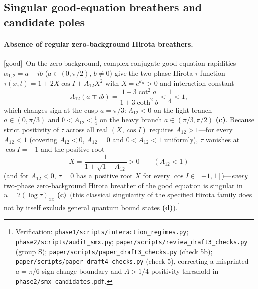 \documentclass[11pt,a4paper]{article}
\newcommand{\lab}[1]{{\normalfont\sffamily\footnotesize\bfseries(#1)}}
\newcommand{\Lc}{\lab{c}}
\newcommand{\Ld}{\lab{d}}
\newcommand{\eqtag}[2]{{\normalfont\sffamily\footnotesize\textcolor{#1}{[#2]}}}
\newcommand{\Good}{\eqtag{teal!70!black}{good}}
\newcommand{\scr}[1]{\nolinkurl{#1}}
\newcommand{\chk}[1]{\footnote{\raggedright Verification: #1.}}
\theoremstyle{remark}
\begin{document}
\subsection{Singular good-equation breathers and candidate poles}\label{sec:goodbreathers}

\paragraph{Absence of regular zero-background Hirota breathers.} \Good\ On the zero background, complex-conjugate good-equation rapidities $\alpha_{1,2}=a\mp ib$ ($a\in(0,\pi/2)$, $b\neq0$) give the two-phase Hirota $\tau$-function $\tau(x,t)=1+2X\cos I+A_{12}X^2$ with $X=e^{\theta_R}>0$ and interaction constant
\begin{equation}\label{eq:Agoodbr}
A_{12}(a\mp ib)=\frac{1-3\cot^2a}{1+3\coth^2b}<\frac14<1,
\end{equation}
which changes sign at the cusp $a=\pi/3$: $A_{12}<0$ on the light branch $a\in(0,\pi/3)$ and $0<A_{12}<\tfrac14$ on the heavy branch $a\in(\pi/3,\pi/2)$ \Lc. Because strict positivity of $\tau$ across all real $(X,\cos I)$ requires $A_{12}>1$---for every $A_{12}<1$ (covering $A_{12}<0$, $A_{12}=0$ and $0<A_{12}<1$ uniformly), $\tau$ vanishes at $\cos I=-1$ and the positive root
\[
X=\frac1{1+\sqrt{1-A_{12}}}>0\qquad(A_{12}<1)
\]
(and for $A_{12}<0$, $\tau=0$ has a positive root $X$ for every $\cos I\in[-1,1]$)---\emph{every} two-phase zero-background Hirota breather of the good equation is singular in $u=2(\log\tau)_{xx}$ \Lc\ (this classical singularity of the specified Hirota family does not by itself exclude general quantum bound states \Ld).\chk{\scr{phase1/scripts/interaction_regimes.py}; \scr{phase2/scripts/audit_smx.py}; \scr{paper/scripts/review_draft3_checks.py} (group S); \scr{paper/scripts/paper_draft3_checks.py} (check 5b); \scr{paper/scripts/paper_draft4_checks.py} (check 5), correcting a misprinted $a=\pi/6$ sign-change boundary and $A>1/4$ positivity threshold in \scr{phase2/smx_candidates.pdf}}
\end{document}
